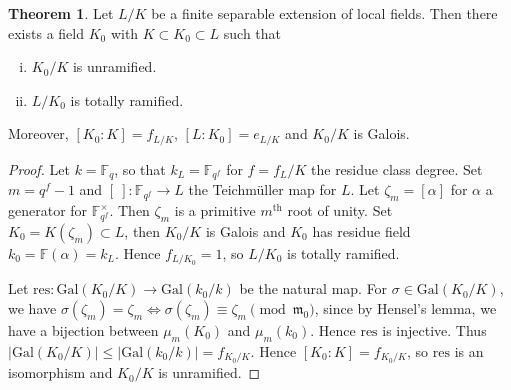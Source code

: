 \documentclass{article}
\theoremstyle{definition}
\newtheorem{theorem}{Theorem}[section]
\begin{document}
\begin{theorem}\label{theorem13.2}
    Let $L/K$ be a finite separable extension of local fields. Then there exists a field $K_0$ with $K \subset K_0 \subset L$ such that 
    \begin{enumerate}[(i)]
        \item $K_0/K$ is unramified.
        \item $L/K_0$ is totally ramified.
    \end{enumerate}
    Moreover, $[K_0 : K] = f_{L/K}$, $[L:K_0] = e_{L/K}$ and $K_0/K$ is Galois.
\end{theorem}
\begin{proof}
    Let $k = \mathbb{F}_q$, so that $k_L = \mathbb{F}_{q^f}$ for $f = f_L/K$ the residue class degree. Set $m = q^f - 1$ and $[~] : \mathbb{F}_{q^f} \to L$ the Teichmüller map for $L$. Let $\zeta_m = [\alpha]$ for $\alpha$ a generator for $\mathbb{F}_{q^f}^\times$. Then $\zeta_m$ is a primitive $m^{\text{th}}$ root of unity. Set $K_0 = K(\zeta_m) \subset L$, then $K_0/K$ is Galois and $K_0$ has residue field $k_0 = \mathbb{F}(\alpha) = k_L$. Hence $f_{L/K_0} = 1$, so $L/K_0$ is totally ramified.
    \vspace{1mm}
     
    Let $\text{res}: \text{Gal}(K_0/K) \to \text{Gal}(k_0/k)$ be the natural map. For $\sigma \in \text{Gal}(K_0/K)$, we have $\sigma(\zeta_m) = \zeta_m \iff \sigma(\zeta_m) \equiv \zeta_m \pmod{\mathfrak{m}_0}$, since by Hensel's lemma, we have a bijection between $\mu_m(K_0)$ and $\mu_m(k_0)$. Hence $\text{res}$ is injective. Thus $|\text{Gal}(K_0/K)|\le |\text{Gal}(k_0/k)| = f_{K_0/K}$. Hence $[K_0:K] = f_{K_0/K}$, so $\text{res}$ is an isomorphism and $K_0/K$ is unramified.
\end{proof}
\end{document}
